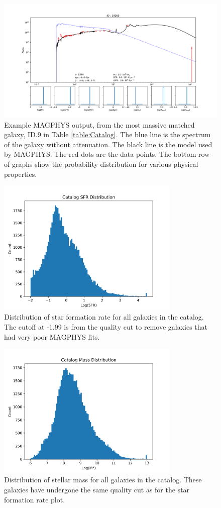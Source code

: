 \begin{figure}[!hbp]
\centering \includegraphics[width=160mm]{19265.pdf}
\caption{Example MAGPHYS output, from the most massive matched galaxy, ID.9 in Table \ref{table:Catalog}. The blue line is the spectrum of the galaxy without attenuation. The black line is the model used by MAGPHYS. The red dots are the data points. The bottom row of graphs show the probability distribution for various physical properties.}
\label{fig:MAGPHYS_Example}
\end{figure}

\begin{figure}[!htbp]
\centering \includegraphics[width=87mm]{Survey/MAGPHYS_SFR.png}
\caption{Distribution of star formation rate for all galaxies in the catalog. The cutoff at -1.99 is from the quality cut to remove galaxies that had very poor MAGPHYS fits.}
\label{fig:MAGPHYS_SFR}
\end{figure}

\begin{figure}[!htbp]
\centering \includegraphics[width=87mm]{Survey/MAGPHYS_Mstar.png}
\caption{Distribution of stellar mass for all galaxies in the catalog. These galaxies have undergone the same quality cut as for the star formation rate plot.}
\label{fig:MAGPHYS_Mstar}
\end{figure}

